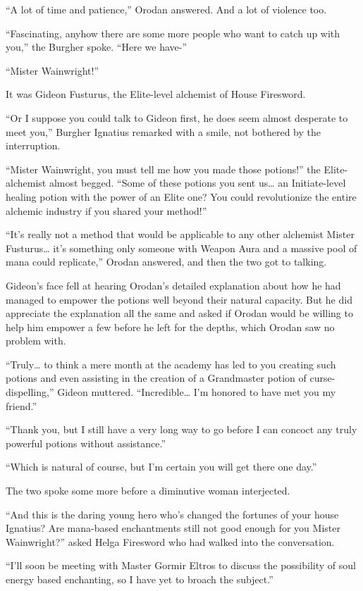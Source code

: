 \documentclass[a4paper,10pt]{book}
\begin{document}
“A lot of time and patience,” Orodan answered. And a lot of violence too.\par
“Fascinating, anyhow there are some more people who want to catch up with you,” the Burgher spoke. “Here we have-”\par
“Mister Wainwright!”\par
It was Gideon Fusturus, the Elite-level alchemist of House Firesword.\par
“Or I suppose you could talk to Gideon first, he does seem almost desperate to meet you,” Burgher Ignatius remarked with a smile, not bothered by the interruption.\par
“Mister Wainwright, you must tell me how you made those potions!” the Elite-alchemist almost begged. “Some of these potions you sent us… an Initiate-level healing potion with the power of an Elite one? You could revolutionize the entire alchemic industry if you shared your method!”\par
“It’s really not a method that would be applicable to any other alchemist Mister Fusturus… it’s something only someone with Weapon Aura and a massive pool of mana could replicate,” Orodan answered, and then the two got to talking.\par
Gideon’s face fell at hearing Orodan’s detailed explanation about how he had managed to empower the potions well beyond their natural capacity. But he did appreciate the explanation all the same and asked if Orodan would be willing to help him empower a few before he left for the depths, which Orodan saw no problem with.\par
“Truly… to think a mere month at the academy has led to you creating such potions and even assisting in the creation of a Grandmaster potion of curse-dispelling,” Gideon muttered. “Incredible… I’m honored to have met you my friend.”\par
“Thank you, but I still have a very long way to go before I can concoct any truly powerful potions without assistance.”\par
“Which is natural of course, but I’m certain you will get there one day.”\par
The two spoke some more before a diminutive woman interjected.\par
“And this is the daring young hero who’s changed the fortunes of your house Ignatius? Are mana-based enchantments still not good enough for you Mister Wainwright?” asked Helga Firesword who had walked into the conversation.\par
“I’ll soon be meeting with Master Gormir Eltros to discuss the possibility of soul energy based enchanting, so I have yet to broach the subject.”\par
\end{document}
